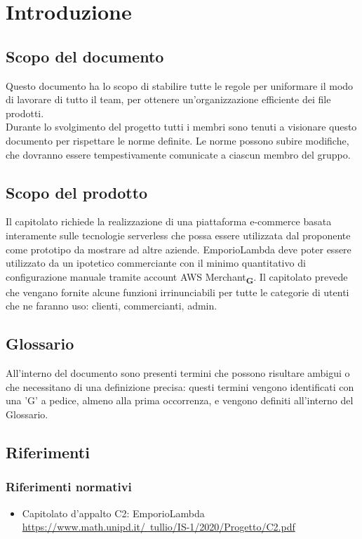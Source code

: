 \section{Introduzione}
\subsection{Scopo del documento}
Questo documento ha lo scopo di stabilire tutte le regole per uniformare il modo di lavorare di tutto il team, per ottenere un'organizzazione efficiente dei file prodotti.\\Durante lo svolgimento del progetto tutti i membri sono tenuti a visionare questo documento per rispettare le norme definite.
Le norme possono subire modifiche, che dovranno essere tempestivamente comunicate a ciascun membro del gruppo.

\subsection{Scopo del prodotto}
Il capitolato richiede la realizzazione di una piattaforma e-commerce basata interamente sulle tecnologie serverless che possa essere utilizzata dal proponente come prototipo da mostrare ad altre aziende. EmporioLambda deve poter essere utilizzato da un ipotetico commerciante con il minimo quantitativo di configurazione manuale tramite account AWS Merchant\textsubscript{\textbf{G}}. Il capitolato prevede che vengano fornite alcune funzioni irrinunciabili per tutte le categorie di utenti che ne faranno uso: clienti, commercianti, admin.
\subsection{Glossario}
All'interno del documento sono presenti termini che possono risultare ambigui o che necessitano di una definizione precisa: questi termini vengono identificati con una 'G' a pedice, almeno alla prima occorrenza, e vengono definiti all'interno del Glossario.
\subsection{Riferimenti}
\subsubsection{Riferimenti normativi}
\begin{itemize}
    \item Capitolato d'appalto C2: EmporioLambda\\ \href{https://www.math.unipd.it/~tullio/IS-1/2020/Progetto/C2.pdf}{https://www.math.unipd.it/~tullio/IS-1/2020/Progetto/C2.pdf}
\end{itemize}

